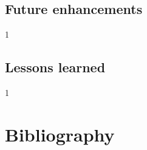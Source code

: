 \documentclass[12pt,a4paper]{report}
\begin{document}
\section{Future enhancements}
1

\section{Lessons learned}
1


\chapter*{Bibliography}  
% 
% 
\end{document}
